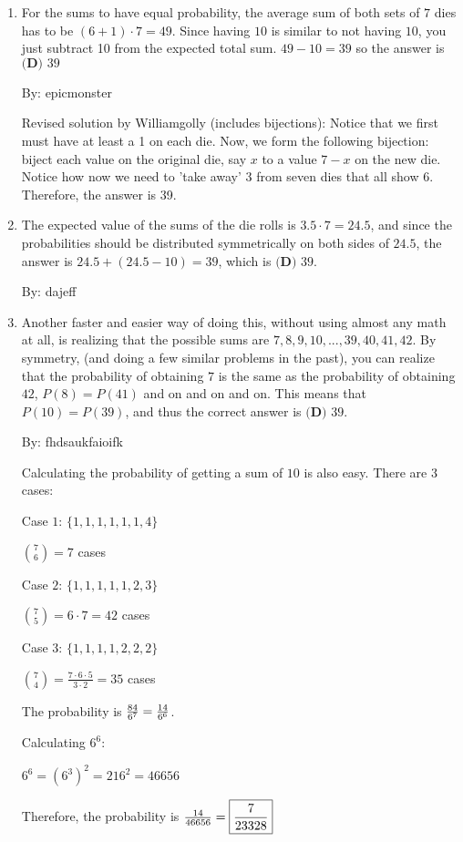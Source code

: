 \documentclass{article}%
\begin{document}
\begin{enumerate}
%
\item%
For the sums to have equal probability, the average sum of both sets of $7$ dies has to be $(6+1)\cdot 7 = 49$. Since having $10$ is similar to not having $10$, you just subtract 10 from the expected total sum. $49 - 10 = 39$ so the answer is $\boxed{\textbf{(D)} \text{ 39}}$

By: epicmonster

Revised solution by Williamgolly (includes bijections):
Notice that we first must have at least a 1 on each die.  Now, we form the following bijection: biject each value on the original die, say $x$ to a value $7-x$ on the new die. Notice how now we need to 'take away' 3 from seven dies that all show 6.  Therefore, the answer is 39.

%
\item%
The expected value of the sums of the die rolls is $3.5\cdot7=24.5$, and since the probabilities should be distributed symmetrically on both sides of $24.5$, the answer is $24.5+(24.5-10)=39$, which is $\boxed{\textbf{(D)} \text{ 39}}$.

By: dajeff

%
\item%
Another faster and easier way of doing this, without using almost any math at all, is realizing that the possible sums are ${7,8,9,10,...,39,40,41,42}$. By symmetry, (and doing a few similar problems in the past), you can realize that the probability of obtaining $7$ is the same as the probability of obtaining $42$, $P(8)=P(41)$ and on and on and on. This means that $P(10)=P(39)$, and thus the correct answer is $\boxed{\textbf{(D)} \text{ 39}}$.

By: fhdsaukfaioifk

Calculating the probability of getting a sum of $10$ is also easy. There are $3$ cases:


Case $1$: $\{1,1,1,1,1,1,4\}$


${7 \choose 6}=7$ cases


Case $2$: $\{1,1,1,1,1,2,3\}$


${7 \choose 5}=6 \cdot 7=42$ cases


Case $3$: $\{1,1,1,1,2,2,2\}$


${7 \choose 4}=\frac {7 \cdot 6 \cdot 5}{3 \cdot 2}=35$ cases


The probability is ${84 \over 6^7} = \frac{14}{6^6}$. 

Calculating $6^6$: 

$6^6=(6^3)^2=216^2=46656$

Therefore, the probability is ${14 \over 46656} = \boxed{{7 \over 23328}}$


\end{enumerate}
\end{document}
